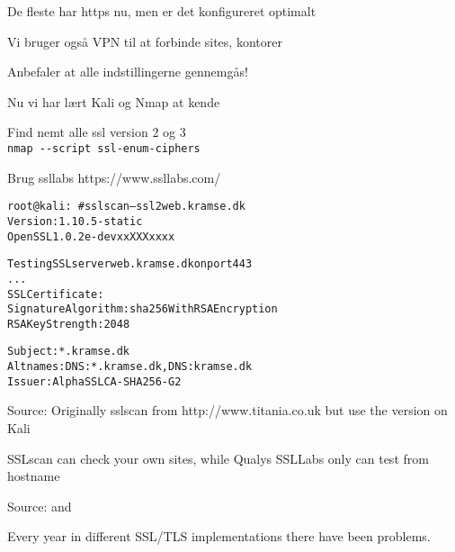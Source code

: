 \documentclass[Screen16to9,17pt]{foils}
\begin{document}
\begin{list2}
\item De fleste har https nu, men er det konfigureret optimalt
\item Vi bruger også VPN til at forbinde sites, kontorer
\item Anbefaler at alle indstillingerne gennemgås!
\end{list2}



\begin{list1}
\item Nu vi har lært Kali og Nmap at kende
\begin{list2}
\item Find nemt alle ssl version 2 og 3\\
\verb+nmap --script ssl-enum-ciphers+
\item Brug ssllabs https://www.ssllabs.com/
\end{list2}
\end{list1}



\begin{alltt}\small
root@kali:~# sslscan --ssl2 web.kramse.dk
Version: 1.10.5-static
OpenSSL 1.0.2e-dev xx XXX xxxx

Testing SSL server web.kramse.dk on port 443
...
  SSL Certificate:
Signature Algorithm: sha256WithRSAEncryption
RSA Key Strength:    2048

Subject:  *.kramse.dk
Altnames: DNS:*.kramse.dk, DNS:kramse.dk
Issuer:   AlphaSSL CA - SHA256 - G2
\end{alltt}

Source:
Originally sslscan from http://www.titania.co.uk
 but use the version on Kali

SSLscan can check your own sites, while Qualys SSLLabs only can test from hostname





Source:  and \\

Every year in different SSL/TLS implementations there have been problems.

\end{document}
